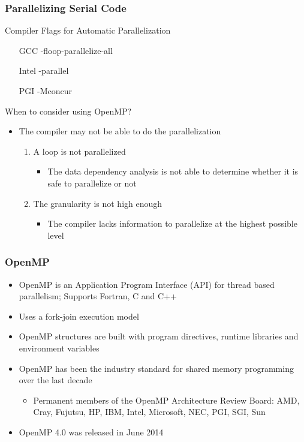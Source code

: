 \documentclass[10pt,t]{beamer}
\begin{document}
\begin{frame}
  \frametitle{Parallelizing Serial Code}
  \begin{exampleblock}{Compiler Flags for Automatic Parallelization}
    \begin{itemize}
      \item[GCC] -floop-parallelize-all
      \item[Intel] -parallel
      \item[PGI] -Mconcur
    \end{itemize}
  \end{exampleblock}
  \begin{block}{When to consider using OpenMP?}
    \begin{itemize}
      \item The compiler may not be able to do the parallelization
      \begin{enumerate}
        \item A loop is not parallelized
        \begin{itemize}
          \item The data dependency analysis is not able to determine whether it is safe to parallelize or not
        \end{itemize}
        \item The granularity is not high enough
        \begin{itemize}
          \item The compiler lacks information to parallelize at the highest possible level
        \end{itemize}
      \end{enumerate}
    \end{itemize}
  \end{block}
\end{frame}

\begin{frame}
  \frametitle{OpenMP}
  \begin{block}{}
    \begin{itemize}
      \item OpenMP is an Application Program Interface (API) for thread based parallelism; Supports Fortran, C and C++
      \item Uses a fork-join execution model
      \item OpenMP structures are built with program directives, runtime libraries and environment variables
      \item OpenMP has been the industry standard for shared memory programming over the last decade
      \begin{itemize}
        \item Permanent members of the OpenMP Architecture Review Board: AMD, Cray, Fujutsu, HP, IBM, Intel, Microsoft, NEC, PGI, SGI, Sun
      \end{itemize}
      \item OpenMP 4.0 was released in June 2014
    \end{itemize}
  \end{block}
\end{frame}
\end{document}

